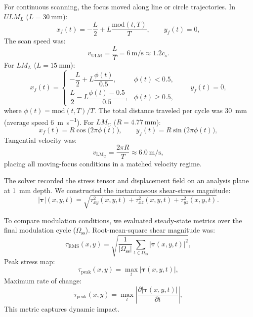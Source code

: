 \documentclass[pdflatex, sn-nature]{sn-jnl}
\theoremstyle{thmstyleone}%
\theoremstyle{thmstyletwo}%
\theoremstyle{thmstylethree}%
\begin{document}
For continuous scanning, the focus moved along line or circle trajectories. In $ULM_L$ ($L=\qty{30}{\milli\meter}$):
\begin{equation}
    x_f(t) = -\frac{L}{2}+L\frac{\mathrm{mod}(t,T)}{T},
    \qquad
    y_f(t)=0,
\end{equation}
The scan speed was:
\begin{equation}
    v_{\mathrm{ULM}} = \frac{L}{T} = \qty{6}{\meter\per\second} \approx 1.2 c_s.
\end{equation}
For $LM_L$ ($L=\qty{15}{\milli\meter}$):
\begin{equation}
    x_f(t)=
    \begin{cases}
        -\dfrac{L}{2}+L\dfrac{\phi(t)}{0.5},    & \phi(t)<0.5,    \\[6pt]
        \dfrac{L}{2}-L\dfrac{\phi(t)-0.5}{0.5}, & \phi(t)\ge 0.5,
    \end{cases}
    \qquad
    y_f(t)=0,
\end{equation}
where $\phi(t)=\mathrm{mod}(t,T)/T$. The total distance traveled per cycle was \qty{30}{\milli\meter} (average speed \qty{6}{\meter\per\second}). For $LM_C$ ($R=\qty{4.77}{\milli\meter}$):
\begin{equation}
    x_f(t)=R\cos\bigl(2\pi\phi(t)\bigr),
    \qquad
    y_f(t)=R\sin\bigl(2\pi\phi(t)\bigr),
\end{equation}
Tangential velocity was:
\begin{equation}
    v_{\mathrm{LM_C}}=\frac{2\pi R}{T}\approx \qty{6.0}{\meter\per\second},
\end{equation}
placing all moving-focus conditions in a matched velocity regime.

The solver recorded the stress tensor and displacement field on an analysis plane at \qty{1}{\milli\meter} depth. We constructed the instantaneous shear-stress magnitude:
\begin{equation}
    |\boldsymbol{\tau}|(x,y,t)=\sqrt{\tau_{xy}^2(x,y,t)+\tau_{xz}^2(x,y,t)+\tau_{yz}^2(x,y,t)}.
\end{equation}

To compare modulation conditions, we evaluated steady-state metrics over the final modulation cycle ($\Omega_{\mathrm{ss}}$). Root-mean-square shear magnitude was:
\begin{equation}
    \tau_{\mathrm{RMS}}(x,y)=\sqrt{\frac{1}{|\Omega_{\mathrm{ss}}|}\sum_{t\in\Omega_{\mathrm{ss}}}|\boldsymbol{\tau}(x,y,t)|^2},
\end{equation}
Peak stress map:
\begin{equation}
    \tau_{\mathrm{peak}}(x,y)=\max_t |\boldsymbol{\tau}(x,y,t)|,
\end{equation}
Maximum rate of change:
\begin{equation}
    \dot{\tau}_{\mathrm{peak}}(x,y)=\max_t \left|\frac{\partial |\boldsymbol{\tau}(x,y,t)|}{\partial t}\right|,
\end{equation}
This metric captures dynamic impact.
\end{document}
